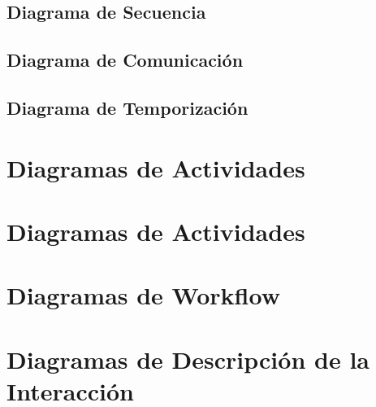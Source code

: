 \subsection{Diagrama de Secuencia}

\newpage

\subsection{Diagrama de Comunicación}

\newpage

\subsection{Diagrama de Temporización}

\newpage

\section{Diagramas de Actividades}

\newpage

\section{Diagramas de Actividades}

\newpage

\section{Diagramas de Workflow}

\newpage

\section{Diagramas de Descripción de la Interacción}

\newpage